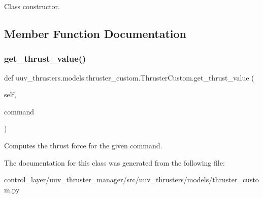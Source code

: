 \begin{DoxyVerb}Class constructor.\end{DoxyVerb}
 

\subsection{Member Function Documentation}
\mbox{\label{classuuv__thrusters_1_1models_1_1thruster__custom_1_1ThrusterCustom_ab745b92cb62dc58b4e68d7789aeb57d9}} 
\subsubsection{\texorpdfstring{get\+\_\+thrust\+\_\+value()}{get\_thrust\_value()}}
{\footnotesize\ttfamily def uuv\+\_\+thrusters.\+models.\+thruster\+\_\+custom.\+Thruster\+Custom.\+get\+\_\+thrust\+\_\+value (\begin{DoxyParamCaption}\item[{}]{self,  }\item[{}]{command }\end{DoxyParamCaption})}

\begin{DoxyVerb}Computes the thrust force for the given command.\end{DoxyVerb}
 

The documentation for this class was generated from the following file\+:\begin{DoxyCompactItemize}
\item 
control\+\_\+layer/uuv\+\_\+thruster\+\_\+manager/src/uuv\+\_\+thrusters/models/thruster\+\_\+custom.\+py\end{DoxyCompactItemize}
